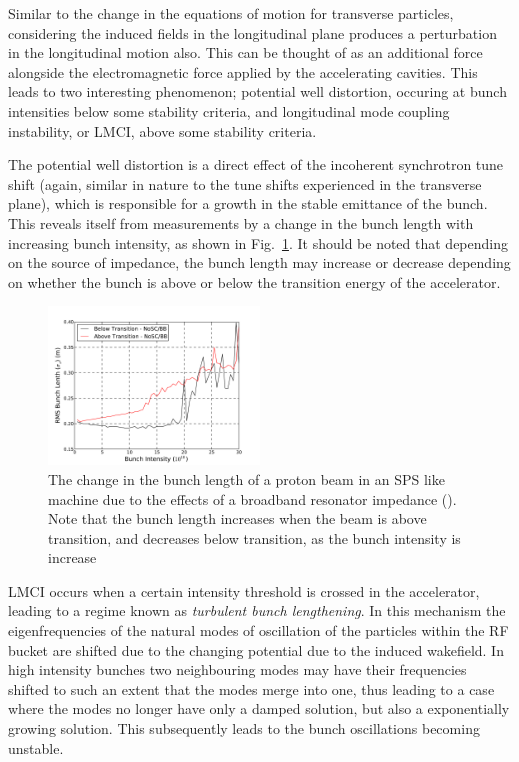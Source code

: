 Similar to the change in the equations of motion for transverse particles, considering the induced fields in the longitudinal plane produces a perturbation in the longitudinal motion also. This can be thought of as an additional force alongside the electromagnetic force applied by the accelerating cavities. This leads to two interesting phenomenon; potential well distortion, occuring at bunch intensities below some stability criteria, and longitudinal mode coupling instability, or LMCI, above some stability criteria.

The potential well distortion is a direct effect of the incoherent synchrotron tune shift (again, similar in nature to the tune shifts experienced in the transverse plane), which is responsible for a growth in the stable emittance of the bunch. This reveals itself from measurements by a change in the bunch length with increasing bunch intensity, as shown in Fig.~\ref{fig:pot_well_dist}. It should be noted that depending on the source of impedance, the bunch length may increase or decrease depending on whether the bunch is above or below the transition energy of the accelerator.

\begin{figure}
\begin{center}
\includegraphics[width=0.5\textwidth]{Wakefields_and_Impedances/figures/rms_bunch_length_AT_BT_BB.pdf}
\end{center}
\caption{The change in the bunch length of a proton beam in an SPS like machine due to the effects of a broadband resonator impedance (). Note that the bunch length increases when the beam is above transition, and decreases below transition, as the bunch intensity is increase}
\label{fig:pot_well_dist}
\end{figure}

LMCI occurs when a certain intensity threshold is crossed in the accelerator, leading to a regime known as \emph{turbulent bunch lengthening}. In this mechanism the eigenfrequencies of the natural modes of oscillation of the particles within the RF bucket are shifted due to the changing potential due to the induced wakefield. In high intensity bunches two neighbouring modes may have their frequencies shifted to such an extent that the modes merge into one, thus leading to a case where the modes no longer have only a damped solution, but also a exponentially growing solution. This subsequently leads to the bunch oscillations becoming unstable.

